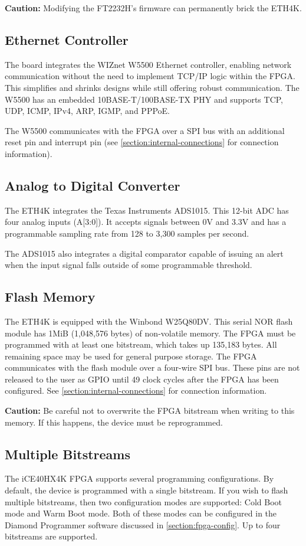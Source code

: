 \textbf{Caution:} Modifying the FT2232H's firmware can permanently brick the ETH4K.

\newpage

\subsection{Ethernet Controller}
The board integrates the WIZnet W5500 Ethernet controller, enabling network communication without the need to implement TCP/IP logic within the FPGA. This simplifies and shrinks designs while still offering robust communication. The W5500 has an embedded 10BASE-T/100BASE-TX PHY and supports TCP, UDP, ICMP, IPv4, ARP, IGMP, and PPPoE.

The W5500 communicates with the FPGA over a SPI bus with an additional reset pin and interrupt pin (see \autoref{section:internal-connections} for connection information).

\subsection{Analog to Digital Converter}
The ETH4K integrates the Texas Instruments ADS1015. This 12-bit ADC has four analog inputs (A[3:0]). It accepts signals between 0V and 3.3V and has a programmable sampling rate from 128 to 3,300 samples per second.

The ADS1015 also integrates a digital comparator capable of issuing an alert when the input signal falls outside of some programmable threshold. 

\subsection{Flash Memory}
The ETH4K is equipped with the Winbond W25Q80DV. This serial NOR flash module has 1MiB (1,048,576 bytes) of non-volatile memory. The FPGA must be programmed with at least one bitstream, which takes up 135,183 bytes. All remaining space may be used for general purpose storage. The FPGA communicates with the flash module over a four-wire SPI bus. These pins are not released to the user as GPIO until 49 clock cycles after the FPGA has been configured. See \autoref{section:internal-connections} for connection information.

\textbf{Caution:} Be careful not to overwrite the FPGA bitstream when writing to this memory. If this happens, the device must be reprogrammed. 

\subsection{Multiple Bitstreams} \label{section:multiple-bitstreams}
The iCE40HX4K FPGA supports several programming configurations. By default, the device is programmed with a single bitstream. If you wish to flash multiple bitstreams, then two configuration modes are supported: Cold Boot mode and Warm Boot mode. Both of these modes can be configured in the Diamond Programmer software discussed in \autoref{section:fpga-config}. Up to four bitstreams are supported.

